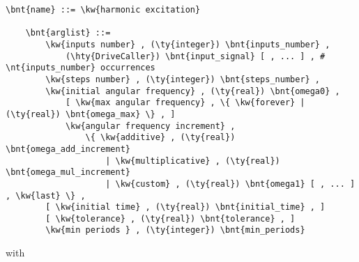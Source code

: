 \begin{Verbatim}[commandchars=\\\{\}]
    \bnt{name} ::= \kw{harmonic excitation}

    \bnt{arglist} ::=
        \kw{inputs number} , (\ty{integer}) \bnt{inputs_number} ,
            (\hty{DriveCaller}) \bnt{input_signal} [ , ... ] , # \nt{inputs_number} occurrences
        \kw{steps number} , (\ty{integer}) \bnt{steps_number} ,
        \kw{initial angular frequency} , (\ty{real}) \bnt{omega0} ,
            [ \kw{max angular frequency} , \{ \kw{forever} | (\ty{real}) \bnt{omega_max} \} , ]
            \kw{angular frequency increment} ,
                \{ \kw{additive} , (\ty{real}) \bnt{omega_add_increment}
                    | \kw{multiplicative} , (\ty{real}) \bnt{omega_mul_increment}
                    | \kw{custom} , (\ty{real}) \bnt{omega1} [ , ... ] , \kw{last} \} ,
        [ \kw{initial time} , (\ty{real}) \bnt{initial_time} , ]
        [ \kw{tolerance} , (\ty{real}) \bnt{tolerance} , ]
        \kw{min periods } , (\ty{integer}) \bnt{min_periods}
\end{Verbatim}
with
